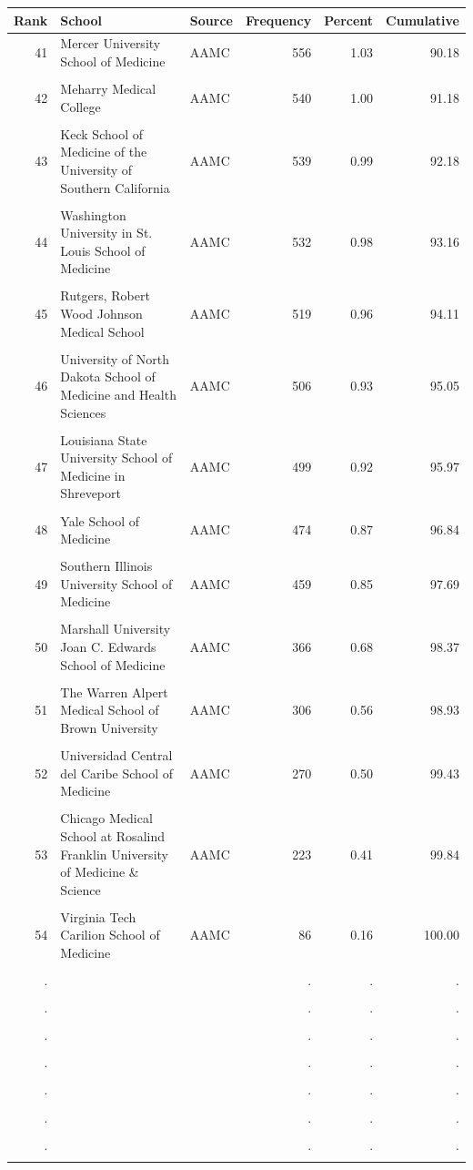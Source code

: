 \begin{tabular}{r p{} l r r r}
\toprule
Rank & School & Source & Frequency & Percent & Cumulative \\ \midrule
41 & Mercer University School of Medicine & AAMC & 556 & 1.03 & 90.18 \\\\
42 & Meharry Medical College & AAMC & 540 & 1.00 & 91.18 \\\\
43 & Keck School of Medicine of the University of Southern California & AAMC & 539 & 0.99 & 92.18 \\\\
44 & Washington University in St. Louis School of Medicine & AAMC & 532 & 0.98 & 93.16 \\\\
45 & Rutgers, Robert Wood Johnson Medical School & AAMC & 519 & 0.96 & 94.11 \\\\
46 & University of North Dakota School of Medicine and Health Sciences & AAMC & 506 & 0.93 & 95.05 \\\\
47 & Louisiana State University School of Medicine in Shreveport & AAMC & 499 & 0.92 & 95.97 \\\\
48 & Yale School of Medicine & AAMC & 474 & 0.87 & 96.84 \\\\
49 & Southern Illinois University School of Medicine & AAMC & 459 & 0.85 & 97.69 \\\\
50 & Marshall University Joan C. Edwards School of Medicine & AAMC & 366 & 0.68 & 98.37 \\\\
51 & The Warren Alpert Medical School of Brown University & AAMC & 306 & 0.56 & 98.93 \\\\
52 & Universidad Central del Caribe School of Medicine & AAMC & 270 & 0.50 & 99.43 \\\\
53 & Chicago Medical School at Rosalind Franklin University of Medicine \& Science & AAMC & 223 & 0.41 & 99.84 \\\\
54 & Virginia Tech Carilion School of Medicine & AAMC & 86 & 0.16 & 100.00 \\\\
. &  &  & . & . & . \\\\
. &  &  & . & . & . \\\\
. &  &  & . & . & . \\\\
. &  &  & . & . & . \\\\
. &  &  & . & . & . \\\\
. &  &  & . & . & . \\\\
. &  &  & . & . & . \\\\
\bottomrule
\end{tabular}
